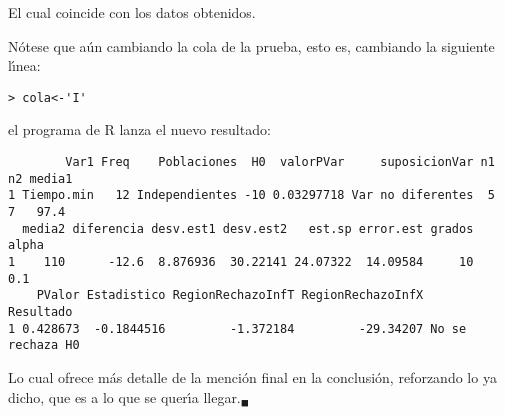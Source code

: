 \begin{solucion}
 El cual coincide con los datos obtenidos.
 \par
 N\'otese que a\'un cambiando la cola de la prueba,
 esto es, cambiando la siguiente l\'{\i}nea:
 \begin{verbatim}
> cola<-'I'
 \end{verbatim}
 \vspace{-0.5cm}
 el programa de R lanza el nuevo resultado:
 \begin{verbatim}
        Var1 Freq    Poblaciones  H0  valorPVar     suposicionVar n1 n2 media1
1 Tiempo.min   12 Independientes -10 0.03297718 Var no diferentes  5  7   97.4
  media2 diferencia desv.est1 desv.est2   est.sp error.est grados alpha
1    110      -12.6  8.876936  30.22141 24.07322  14.09584     10   0.1
    PValor Estadistico RegionRechazoInfT RegionRechazoInfX        Resultado
1 0.428673  -0.1844516         -1.372184         -29.34207 No se rechaza H0
 \end{verbatim}
 \vspace{-0.5cm}
 Lo cual ofrece m\'as detalle de la menci\'on final
 en la conclusi\'on, reforzando lo ya dicho,
 que es a lo que se quer\'{\i}a llegar.${}_{\blacksquare}$
\end{solucion}
